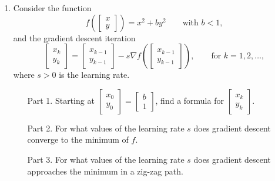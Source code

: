 \documentclass{article}
\begin{document}
\begin{itemize}
\begin{enumerate}
\item Consider the function
\[
f\left(\begin{bmatrix}x\\y\end{bmatrix} \right) = x^2 + by^2 \qquad \mbox{with }b<1,
\]
and the gradient descent iteration
\[
\begin{bmatrix}x_k\\y_k\end{bmatrix}  = 
\begin{bmatrix}x_{k-1}\\y_{k-1}\end{bmatrix} -
s \nabla f\left(\begin{bmatrix}x_{k-1}\\y_{k-1}\end{bmatrix} \right), \qquad \mbox{for }k=1,2,\hdots,
\]
where $s>0$ is the learning rate.

\medskip

\begin{enumerate}
\item[Part 1.] Starting at $\begin{bmatrix}x_0\\y_0\end{bmatrix} = \begin{bmatrix} b \\ 1 \end{bmatrix}$, find a formula for $\begin{bmatrix}x_k\\y_k\end{bmatrix}$.
\item[Part 2.] For what values of the learning rate $s$ does gradient descent converge to the minimum of $f$.
\item[Part 3.] For what values of the learning rate $s$ does gradient descent approaches the minimum in a zig-zag path.
\end{enumerate}

\end{enumerate}
\end{itemize}
\end{document}
